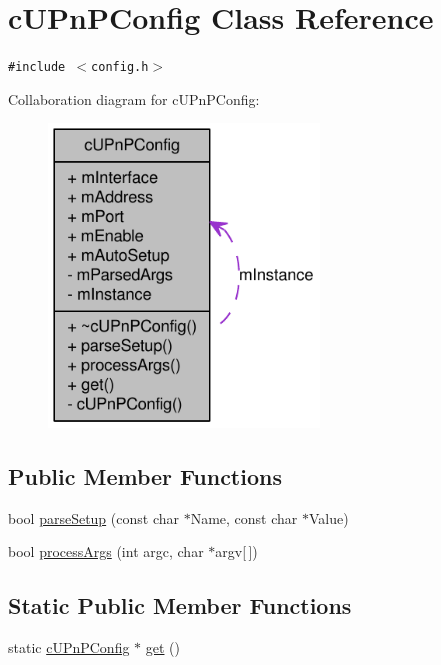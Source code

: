 \hypertarget{classcUPnPConfig}{
\section{cUPnPConfig Class Reference}
\label{classcUPnPConfig}
}
{\tt \#include $<$config.h$>$}

Collaboration diagram for cUPnPConfig:\nopagebreak
\begin{figure}[H]
\begin{center}
\leavevmode
\includegraphics[width=204pt]{classcUPnPConfig__coll__graph}
\end{center}
\end{figure}
\subsection*{Public Member Functions}
\begin{CompactItemize}
\item 
bool \hyperlink{classcUPnPConfig_3ac0d1253dba86cb4630bc1e29a9fe10}{parseSetup} (const char $\ast$Name, const char $\ast$Value)
\item 
bool \hyperlink{classcUPnPConfig_19689798911a39c47958e819c33d4b09}{processArgs} (int argc, char $\ast$argv\mbox{[}$\,$\mbox{]})
\end{CompactItemize}
\subsection*{Static Public Member Functions}
\begin{CompactItemize}
\item 
static \hyperlink{classcUPnPConfig}{cUPnPConfig} $\ast$ \hyperlink{classcUPnPConfig_3949dcc8a418edb8a0ece2dce62f515c}{get} ()
\end{CompactItemize}
